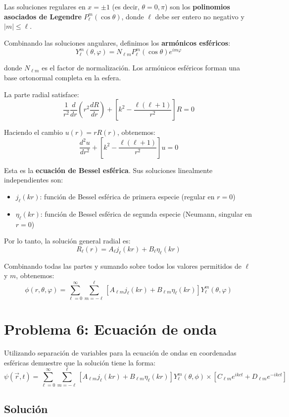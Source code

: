 \documentclass[a4paper]{article}
\begin{document}
Las soluciones regulares en $x = \pm 1$ (es decir, $\theta = 0, \pi$) son los \textbf{polinomios asociados de Legendre} $P_\ell^m(\cos\theta)$, donde $\ell$ debe ser entero no negativo y $|m| \leq \ell$.

Combinando las soluciones angulares, definimos los \textbf{armónicos esféricos}:
$$Y_\ell^m(\theta, \varphi) = N_{\ell m} P_\ell^m(\cos\theta) e^{im\varphi}$$

donde $N_{\ell m}$ es el factor de normalización. Los armónicos esféricos forman una base ortonormal completa en la esfera.

La parte radial satisface:
$$\frac{1}{r^2}\frac{d}{dr}\left(r^2\frac{dR}{dr}\right) + \left[k^2 - \frac{\ell(\ell+1)}{r^2}\right]R = 0$$

Haciendo el cambio $u(r) = rR(r)$, obtenemos:
$$\frac{d^2u}{dr^2} + \left[k^2 - \frac{\ell(\ell+1)}{r^2}\right]u = 0$$

Esta es la \textbf{ecuación de Bessel esférica}. Sus soluciones linealmente independientes son:
\begin{itemize}
\item $j_\ell(kr)$: función de Bessel esférica de primera especie (regular en $r=0$)
\item $\eta_\ell(kr)$: función de Bessel esférica de segunda especie (Neumann, singular en $r=0$)
\end{itemize}

Por lo tanto, la solución general radial es:
$$R_\ell(r) = A_\ell j_\ell(kr) + B_\ell \eta_\ell(kr)$$


Combinando todas las partes y sumando sobre todos los valores permitidos de $\ell$ y $m$, obtenemos:
$$\phi(r, \theta, \varphi) = \sum_{\ell=0}^{\infty} \sum_{m=-\ell}^{\ell} [A_{\ell m} j_\ell(kr) + B_{\ell m} \eta_\ell(kr)] Y_\ell^m(\theta, \varphi)$$

\section{Problema 6: Ecuación de onda}
Utilizando separación de variables para la ecuación de ondas en coordenadas esféricas demuestre que la solución tiene la forma:
$$\psi(\vec{r}, t) = \sum_{\ell=0}^{\infty} \sum_{m=-\ell}^{\ell} [A_{\ell m} j_\ell(kr) + B_{\ell m} \eta_\ell(kr)] Y_\ell^m(\theta, \phi) \times [C_{\ell m} e^{ikct} + D_{\ell m} e^{-ikct}]$$

\subsection{Solución}
\end{document}
